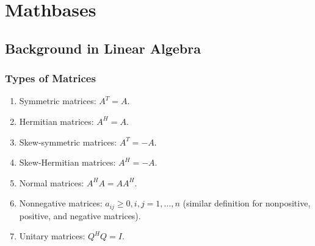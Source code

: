 \chapter{Mathbases}
\label{mathbase}
\section{Background in Linear Algebra}
\subsection{Types of Matrices}
\begin{enumerate}
    \item Symmetric matrices: $A^T = A$.
    \item Hermitian matrices: $A^H = A$.
    \item Skew-symmetric matrices: $A^T = -A$.
    \item Skew-Hermitian matrices: $A^H = -A$.
    \item Normal matrices: $A^H A = A A^H$.
    \item Nonnegative matrices: $a_{ij}\geq 0, i,j=1,\dots,n$ (similar definition for nonpositive, positive, and negative matrices).
    \item Unitary matrices: $Q^H Q = I$.
\end{enumerate}
